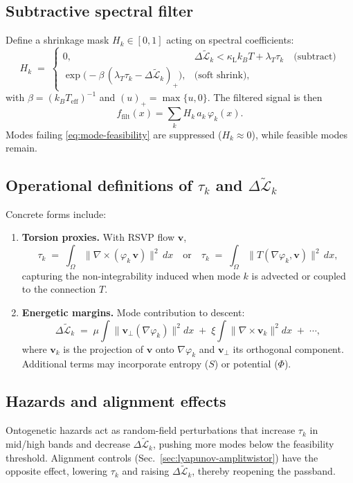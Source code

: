 \documentclass[a4paper,11pt]{article}
\begin{document}
\subsection{Subtractive spectral filter}
Define a shrinkage mask $H_k\in[0,1]$ acting on spectral coefficients:
\begin{equation}
\label{eq:hard-soft-mask}
H_k \;=\;
\begin{cases}
0, & \Delta\widetilde{\mathcal{L}}_k < \kappa_{\mathrm L}k_B T + \lambda_T \tau_k \quad\text{(subtract)}\\[4pt]
\exp\!\big(-\beta\,(\lambda_T \tau_k - \Delta\widetilde{\mathcal{L}}_k)_+\big), & \text{(soft shrink)},
\end{cases}
\end{equation}
with $\beta=(k_B T_{\mathrm{eff}})^{-1}$ and $(u)_+=\max\{u,0\}$. The filtered
signal is then
\begin{equation}
\label{eq:filtered-recon}
f_{\mathrm{filt}}(x)=\sum_{k} H_k\,a_k\,\varphi_k(x).
\end{equation}
Modes failing \eqref{eq:mode-feasibility} are suppressed ($H_k\approx 0$),
while feasible modes remain.

\subsection{Operational definitions of $\tau_k$ and $\Delta\widetilde{\mathcal{L}}_k$}
Concrete forms include:
\begin{enumerate}
\item \textbf{Torsion proxies.} With RSVP flow $\mathbf v$,
\[
\tau_k \;=\; \int_\Omega \|\nabla\times(\varphi_k\,\mathbf v)\|^2\,dx
\quad\text{or}\quad
\tau_k \;=\; \int_\Omega \|T(\nabla\varphi_k,\mathbf v)\|^2\,dx,
\]
capturing the non-integrability induced when mode $k$ is advected or coupled to
the connection $T$.
\item \textbf{Energetic margins.} Mode contribution to descent:
\[
\Delta\widetilde{\mathcal{L}}_k \;=\;
\mu \int \|\mathbf v_\perp(\nabla \varphi_k)\|^2 dx
\;+\;\xi \int \|\nabla\times \mathbf v_k\|^2 dx \;+\;\cdots,
\]
where $\mathbf v_k$ is the projection of $\mathbf v$ onto $\nabla\varphi_k$ and
$\mathbf v_\perp$ its orthogonal component. Additional terms may incorporate
entropy ($S$) or potential ($\Phi$).
\end{enumerate}

\subsection{Hazards and alignment effects}
Ontogenetic hazards act as random-field perturbations that increase $\tau_k$ in
mid/high bands and decrease $\Delta\widetilde{\mathcal{L}}_k$, pushing more
modes below the feasibility threshold. Alignment controls
(Sec.~\ref{sec:lyapunov-amplitwistor}) have the opposite effect, lowering
$\tau_k$ and raising $\Delta\widetilde{\mathcal{L}}_k$, thereby reopening the
passband.
\end{document}
